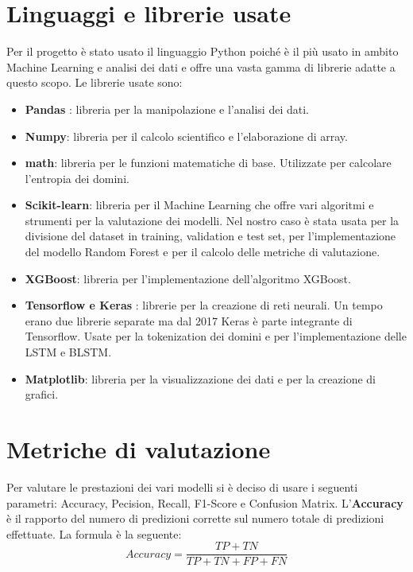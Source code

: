 \documentclass[12pt,a4paper,openright,twoside]{book}
\begin{document}
\section{Linguaggi e librerie usate}
Per il progetto è stato usato il linguaggio Python\cite{python} poiché è il più usato
in ambito Machine Learning e analisi dei dati e offre una vasta gamma di librerie
adatte a questo scopo. Le librerie usate sono:
\begin{itemize}
    \item \textbf{Pandas} \cite{pandas}: libreria per la manipolazione e l'analisi dei dati.
    \item \textbf{Numpy}\cite{numpy}: libreria per il calcolo scientifico e l'elaborazione di array.
    \item \textbf{math}\cite{math}: libreria per le funzioni matematiche di base. Utilizzate per calcolare
    l'entropia dei domini.
    \item \textbf{Scikit-learn}\cite{scikit_learn}: libreria per il Machine Learning che offre vari algoritmi
    e strumenti per la valutazione dei modelli. Nel nostro caso è stata usata per 
    la divisione del dataset in training, validation e test set,
    per l'implementazione del modello Random Forest e per il calcolo delle metriche di valutazione.
    \item \textbf{XGBoost}\cite{xgboost_cl}: libreria per l'implementazione dell'algoritmo XGBoost.
    \item \textbf{Tensorflow e Keras}\cite{Keras} \cite{tensorflow}: librerie per la creazione di reti neurali. Un tempo erano due librerie
    separate ma dal 2017 Keras è parte integrante di Tensorflow. 
    Usate per la tokenization dei domini e per l'implementazione delle LSTM e BLSTM.
    \item \textbf{Matplotlib}\cite{matplotlib}: libreria per la visualizzazione dei dati e per la creazione di grafici.
\end{itemize}

\section{Metriche di valutazione}
Per valutare le prestazioni dei vari modelli si è deciso di usare i seguenti
parametri:
Accuracy, Pecision, Recall, F1-Score e Confusion Matrix. \hfill \break
L'\textbf{Accuracy} è il rapporto del numero di predizioni
corrette sul numero totale di predizioni effettuate.
La formula è la seguente:
\begin{equation}
    Accuracy = \frac{TP + TN}{TP + TN + FP + FN}
\end{equation}
\end{document}
